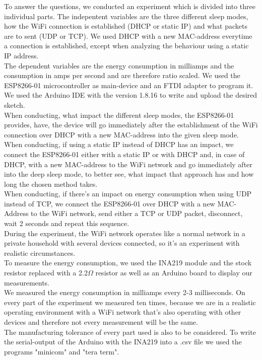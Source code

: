 To answer the questions, we conducted an experiment which is divided into three individual parts.
The indepentent variables are the three different sleep modes, how the WiFi connection is established (DHCP or static IP) and what packets are to sent (UDP or TCP).
We used DHCP with a new MAC-address everytime a connection is established, except when analyzing the behaviour using a static IP address.\\
The dependent variables are the energy consumption in milliamps and the consumption in amps per second and are therefore ratio scaled.
We used the ESP8266-01 microcontroller as main-device and an FTDI adapter to program it. We used the Arduino IDE with the version 1.8.16 to write and upload the desired sketch.\\
When conducting, what impact the different sleep modes, the ESP8266-01 provides, have, the device will go immediately after the establishment of the WiFi connection over DHCP with a new MAC-address into the given sleep mode.\\
When conducting, if using a static IP instead of DHCP has an impact, we connect the ESP8266-01 either with a static IP or with DHCP and, in case of DHCP, with a new MAC-address to the WiFi network and go immediately after into the deep sleep mode, to better see, what impact that approach has and how long the chosen method takes.\\
When conducting, if there's an impact on energy consumption when using UDP instead of TCP, we connect the ESP8266-01 over DHCP with a new MAC-Address to the WiFi network, send either a TCP or UDP packet, disconnect, wait 2 seconds and repeat this sequence.\\
During the experiment, the WiFi network operates like a normal network in a private household with several devices connected, so it's an experiment with realistic circumstances.\\
To measure the energy consumption, we used the INA219 module and the stock resistor replaced with a 2.2$\Omega$ resistor as well as an Arduino board to display our measurements. \\
We measured the energy consumption in milliamps every 2-3 milliseconds.
On every part of the experiment we measured ten times, because we are in a realistic operating environment with a WiFi network that's also operating with other devices and therefore not every measurement will be the same.\\
The manufacturing tolerance of every part used is also to be considered.
To write the serial-output of the Arduino with the INA219 into a .csv file we used the programs "minicom" and "tera term".





